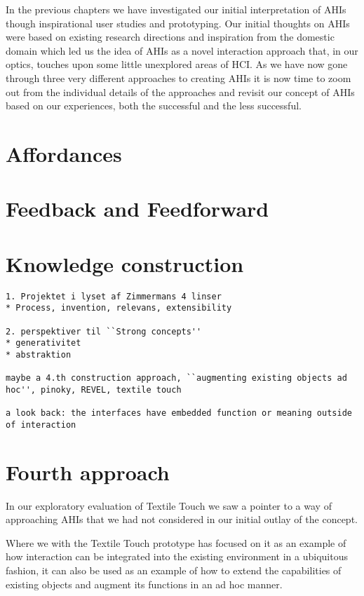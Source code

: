 In the previous chapters we have investigated our initial interpretation of AHIs though inspirational user studies and prototyping.
Our initial thoughts on AHIs were based on existing research directions and inspiration from the domestic domain which led us the idea of AHIs as a novel interaction approach that, in our optics, touches upon some little unexplored areas of HCI.  
As we have now gone through three very different approaches to creating AHIs it is now time to zoom out from the individual details of the approaches and revisit our concept of AHIs based on our experiences, both the successful and the less successful.

\section{Affordances}
\section{Feedback and Feedforward}

\section{Knowledge construction}

\begin{verbatim}
1. Projektet i lyset af Zimmermans 4 linser
* Process, invention, relevans, extensibility

2. perspektiver til ``Strong concepts''
* generativitet
* abstraktion

maybe a 4.th construction approach, ``augmenting existing objects ad hoc'', pinoky, REVEL, textile touch

a look back: the interfaces have embedded function or meaning outside of interaction
\end{verbatim}

\section{Fourth approach}
In our exploratory evaluation of Textile Touch we saw a pointer to a way of approaching AHIs that we had not considered in our initial outlay of the concept.


Where we with the Textile Touch prototype has focused on it as an example of how interaction can be integrated into the existing environment in a ubiquitous fashion, it can also be used as an example of how to extend the capabilities of existing objects and augment its functions in an ad hoc manner.

